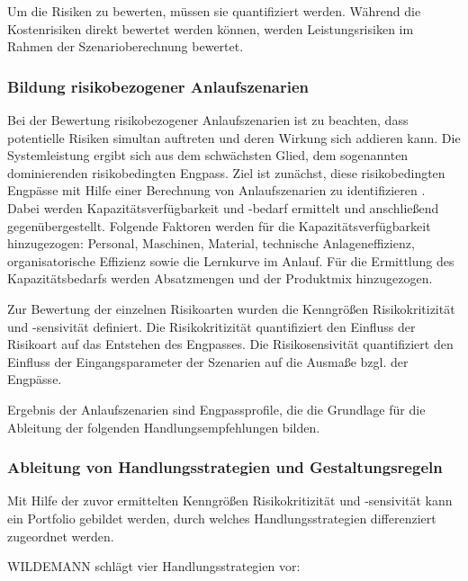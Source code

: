 Um die Risiken zu bewerten, müssen sie quantifiziert werden. Während die Kostenrisiken direkt bewertet werden können, werden Leistungsrisiken im Rahmen der Szenarioberechnung bewertet. 

\subsubsection*{Bildung risikobezogener Anlaufszenarien}\label{sec:wildemannszenarien}
Bei der Bewertung risikobezogener Anlaufszenarien ist zu beachten, dass potentielle Risiken simultan auftreten und deren Wirkung sich addieren kann. Die Systemleistung ergibt sich aus dem schwächsten Glied, dem sogenannten dominierenden risikobedingten Engpass. Ziel ist zunächst, diese risikobedingten Engpässe mit Hilfe einer Berechnung von Anlaufszenarien zu identifizieren \autocite{Fleischer2003}. 
Dabei werden Kapazitätsverfügbarkeit und -bedarf ermittelt und anschließend gegenübergestellt. Folgende Faktoren werden für die Kapazitätsverfügbarkeit hinzugezogen: Personal, Maschinen, Material, technische Anlageneffizienz, organisatorische Effizienz sowie die Lernkurve im Anlauf.
Für die Ermittlung des Kapazitätsbedarfs werden Absatzmengen und der Produktmix hinzugezogen. 

Zur Bewertung der einzelnen Risikoarten wurden die Kenngrößen Risikokritizität und -sensivität definiert. 
Die Risikokritizität quantifiziert den Einfluss der Risikoart auf das Entstehen des Engpasses. Die Risikosensivität quantifiziert den Einfluss der Eingangsparameter der Szenarien auf die Ausmaße bzgl. der Engpässe. 

Ergebnis der Anlaufszenarien sind Engpassprofile, die die Grundlage für die Ableitung der folgenden Handlungsempfehlungen bilden. 

\subsubsection*{Ableitung von Handlungsstrategien und Gestaltungsregeln}

Mit Hilfe der zuvor ermittelten Kenngrößen Risikokritizität und -sensivität kann ein Portfolio gebildet werden, durch welches Handlungsstrategien differenziert zugeordnet werden. 

WILDEMANN schlägt vier Handlungsstrategien vor: 

